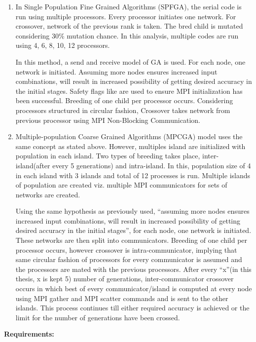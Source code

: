 \begin{enumerate}
	\item In Single Population Fine Grained Algorithms (SPFGA), the serial code is run using multiple processors. Every processor initiates one network. For crossover, network of the previous rank is taken. The bred child is mutated considering 30\% mutation chance. In this analysis, multiple codes are run using 4, 6, 8, 10, 12 processors.
	
	
	In this method, a send and receive model of GA is used. For each node, one network is initiated. Assuming more nodes ensures increased input combinations, will result in increased possibility of getting desired accuracy in the initial stages. Safety flags like are used to ensure MPI initialization has been successful. Breeding of one child per processor occurs. Considering processors structured in circular fashion, Crossover takes network from previous processor using MPI Non-Blocking Communication.
	\item Multiple-population Coarse Grained Algorithms (MPCGA) model uses the same concept as stated above. However, multiples island are initialized with population in each island. Two types of breeding takes place, inter-island(after every 5 generations) and intra-island. In this, population size of 4 in each island with 3 islands and total of 12 processes is run. Multiple islands of population are created viz. multiple MPI communicators for sets of networks are created. 
	
	
	Using the same hypothesis as previously used, “assuming more nodes ensures increased input combinations, will result in increased possibility of getting desired accuracy in the initial stages”, for each node, one network is initiated. These networks are then split into communicators. Breeding of one child per processor occurs, however crossover is intra-communicator, implying that same circular fashion of processors for every communicator is assumed and the processors are mated with the previous processors.
	After every “x”(in this thesis, x is kept 5) number of generations, inter-communicator crossover occurs in which best of every communicator/island is computed at every node using MPI gather and MPI scatter commands and is sent to the other islands. This process continues till either required accuracy is achieved or the limit for the number of generations have been crossed.
	
\end{enumerate}


\textbf{Requirements:}

